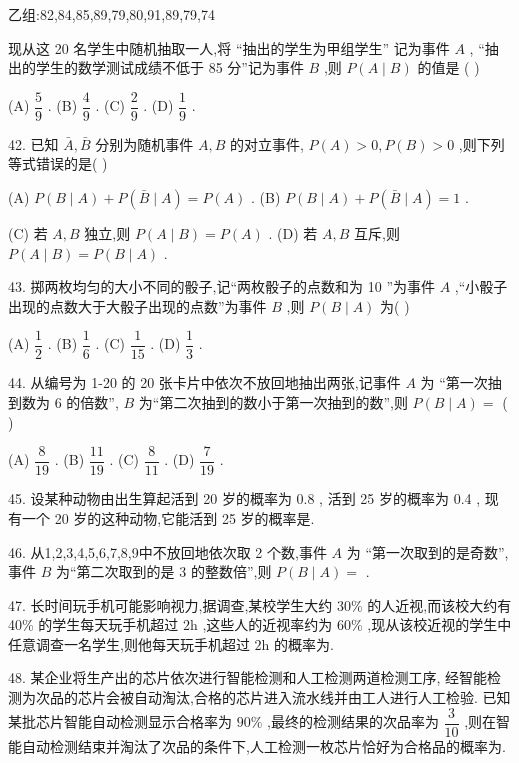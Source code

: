 乙组:82,84,85,89,79,80,91,89,79,74

现从这 20 名学生中随机抽取一人,将 “抽出的学生为甲组学生” 记为事件 $A$ , “抽出的学生的数学测试成绩不低于 85 分”记为事件 $B$ ,则 $P\left( {A \mid  B}\right)$ 的值是 (   )

(A) $\dfrac{5}{9}$ . (B) $\dfrac{4}{9}$ . (C) $\dfrac{2}{9}$ . (D) $\dfrac{1}{9}$ .

42. 已知 $\bar{A},\bar{B}$ 分别为随机事件 $A,B$ 的对立事件, $P\left( A\right)  > 0,P\left( B\right)  > 0$ ,则下列等式错误的是(   )

(A) $P\left( {B \mid  A}\right)  + P\left( {\bar{B} \mid  A}\right)  = P\left( A\right)$ . (B) $P\left( {B \mid  A}\right)  + P\left( {\bar{B} \mid  A}\right)  = 1$ .

(C) 若 $A,B$ 独立,则 $P\left( {A \mid  B}\right)  = P\left( A\right)$ . (D) 若 $A,B$ 互斥,则 $P\left( {A \mid  B}\right)  = P\left( {B \mid  A}\right)$ .

43. 掷两枚均匀的大小不同的骰子,记“两枚骰子的点数和为 10 ”为事件 $A$ ,“小骰子出现的点数大于大骰子出现的点数”为事件 $B$ ,则 $P\left( {B \mid  A}\right)$ 为(   )

(A) $\dfrac{1}{2}$ . (B) $\dfrac{1}{6}$ . (C) $\dfrac{1}{15}$ . (D) $\dfrac{1}{3}$ .

44. 从编号为 1-20 的 20 张卡片中依次不放回地抽出两张,记事件 $A$ 为 “第一次抽到数为 6 的倍数”, $B$ 为“第二次抽到的数小于第一次抽到的数”,则 $P\left( {B \mid  A}\right)  =$ (   )

(A) $\dfrac{8}{19}$ . (B) $\dfrac{11}{19}$ . (C) $\dfrac{8}{11}$ . (D) $\dfrac{7}{19}$ .

45. 设某种动物由出生算起活到 20 岁的概率为 0.8 , 活到 25 岁的概率为 0.4 , 现有一个 20 岁的这种动物,它能活到 25 岁的概率是\blkda{}.

46. 从1,2,3,4,5,6,7,8,9中不放回地依次取 2 个数,事件 $A$ 为 “第一次取到的是奇数”,事件 $B$ 为“第二次取到的是 3 的整数倍”,则 $P\left( {B \mid  A}\right)  =$ \blkda{}.

47. 长时间玩手机可能影响视力,据调查,某校学生大约 30\% 的人近视,而该校大约有 40\% 的学生每天玩手机超过 $2\mathrm{h}$ ,这些人的近视率约为 ${60}\%$ ,现从该校近视的学生中任意调查一名学生,则他每天玩手机超过 $2\mathrm{h}$ 的概率为\blkda{}.

48. 某企业将生产出的芯片依次进行智能检测和人工检测两道检测工序, 经智能检测为次品的芯片会被自动淘汰,合格的芯片进入流水线并由工人进行人工检验. 已知某批芯片智能自动检测显示合格率为 ${90}\%$ ,最终的检测结果的次品率为 $\dfrac{3}{10}$ ,则在智能自动检测结束并淘汰了次品的条件下,人工检测一枚芯片恰好为合格品的概率为\blkda{}.


